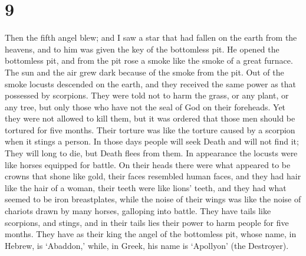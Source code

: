 \hypertarget{section-8}{%
\section{9}\label{section-8}}

 Then the fifth angel blew; and I saw a star that had fallen
on the earth from the heavens, and to him was given the key of the
bottomless pit.  He opened the bottomless pit, and from the
pit rose a smoke like the smoke of a great furnace. The sun and the air
grew dark because of the smoke from the pit.  Out of the
smoke locusts descended on the earth, and they received the same power
as that possessed by scorpions.  They were told not to harm
the grass, or any plant, or any tree, but only those who have not the
seal of God on their foreheads.  Yet they were not allowed
to kill them, but it was ordered that those men should be tortured for
five months. Their torture was like the torture caused by a scorpion
when it stings a person.  In those days people will seek
Death and will not find it; They will long to die, but Death flees from
them.  In appearance the locusts were like horses equipped
for battle. On their heads there were what appeared to be crowns that
shone like gold, their faces resembled human faces,  and
they had hair like the hair of a woman, their teeth were like lions'
teeth,  and they had what seemed to be iron breastplates,
while the noise of their wings was like the noise of chariots drawn by
many horses, galloping into battle.  They have tails like
scorpions, and stings, and in their tails lies their power to harm
people for five months.  They have as their king the angel
of the bottomless pit, whose name, in Hebrew, is `Abaddon,' while, in
Greek, his name is `Apollyon' (the Destroyer).

